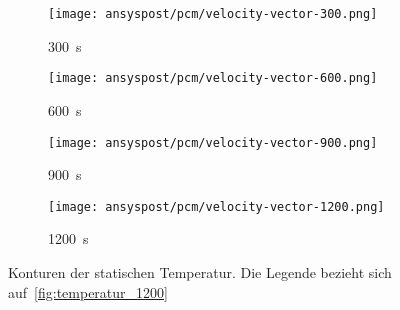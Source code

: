 \begin{figure}[H]
    \centering

    \begin{subfigure}[t]{0.14\textwidth}
        \centering
    \end{subfigure}%
    \hspace{2mm}%
    \begin{subfigure}[t]{0.2\textwidth}
        \centering
        \texttt{[image: ansyspost/pcm/velocity-vector-300.png]}
        \caption{\SI{300}{\second}}\label{fig:velocity_vector_300}
    \end{subfigure}%
    \begin{subfigure}[t]{0.2\textwidth}
        \centering
        \texttt{[image: ansyspost/pcm/velocity-vector-600.png]}
        \caption{\SI{600}{\second}}\label{fig:velocity_vector_600}
    \end{subfigure}%
    \begin{subfigure}[t]{0.2\textwidth}
        \centering
        \texttt{[image: ansyspost/pcm/velocity-vector-900.png]}
        \caption{\SI{900}{\second}}\label{fig:velocity_vector_900}
    \end{subfigure}%
    \begin{subfigure}[t]{0.2\textwidth}
        \centering
        \texttt{[image: ansyspost/pcm/velocity-vector-1200.png]}
        \caption{\SI{1200}{\second}}\label{fig:velocity_vector_1200}
    \end{subfigure}
    \caption{Konturen der statischen Temperatur. Die Legende bezieht sich auf~\ref{fig:temperatur_1200}}\label{fig:pcm_static_temperature_kontur}
\end{figure}